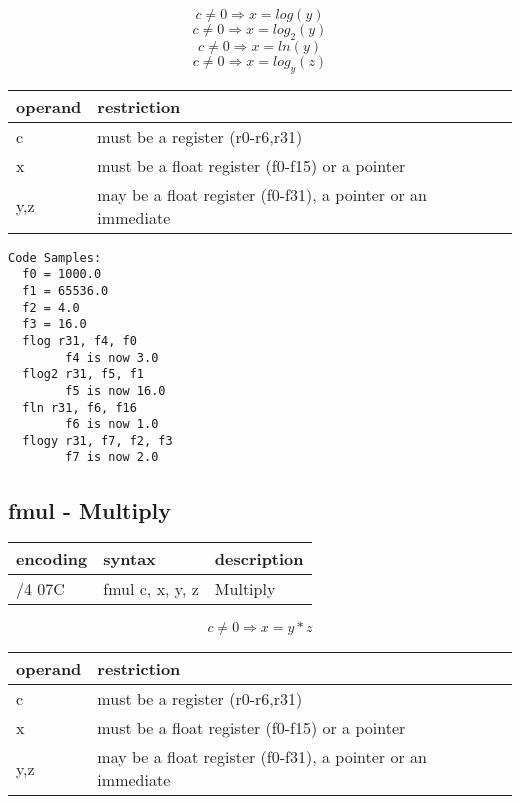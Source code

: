 \documentclass[letterpaper,10pt,openright,twoside,onecolumn]{book}
\begin{document}
  \begin{displaymath} c \neq 0 \Rightarrow x = log(y)\end{displaymath}
  \begin{displaymath} c \neq 0 \Rightarrow x = log_2 (y)\end{displaymath}
  \begin{displaymath} c \neq 0 \Rightarrow x = ln(y)\end{displaymath}
  \begin{displaymath} c \neq 0 \Rightarrow x = log_y (z)\end{displaymath}

  \flushleft
  \begin{tabular}{|l|l|}
   \hline
    operand & restriction \\
   \hline
    c & must be a register (r0-r6,r31) \\
    x & must be a float register (f0-f15) or a pointer \\
    y,z & may be a float register (f0-f31), a pointer or an immediate \\
   \hline
  \end{tabular}

  \begin{verbatim}
Code Samples:
  f0 = 1000.0
  f1 = 65536.0
  f2 = 4.0
  f3 = 16.0
  flog r31, f4, f0
        f4 is now 3.0
  flog2 r31, f5, f1
        f5 is now 16.0
  fln r31, f6, f16
        f6 is now 1.0
  flogy r31, f7, f2, f3
        f7 is now 2.0
  \end{verbatim}
\newpage\subsection{fmul - Multiply}
  \begin{tabular}{|l|l|l|}
   \hline
    encoding & syntax & description \\
   \hline
    /4 07C & fmul c, x, y, z & Multiply \\
   \hline
  \end{tabular}

  \begin{displaymath} c \neq 0 \Rightarrow x = y * z\end{displaymath}

  \flushleft
  \begin{tabular}{|l|l|}
   \hline
    operand & restriction \\
   \hline
    c & must be a register (r0-r6,r31) \\
    x & must be a float register (f0-f15) or a pointer \\
    y,z & may be a float register (f0-f31), a pointer or an immediate \\
   \hline
  \end{tabular}
\end{document}
